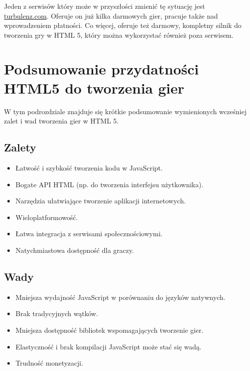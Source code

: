 Jeden z serwisów który może w przyszłości zmienić tę sytuację jest \url{turbulenz.com}.
Oferuje on już kilka darmowych gier,
pracuje także nad wprowadzeniem płatności. Co więcej, oferuje też darmowy, kompletny silnik
do tworzenia gry w HTML 5, który można wykorzystać również poza serwisem.

\section{Podsumowanie przydatności HTML5 do tworzenia gier}
\label{sec:przydatność}

W tym podrozdziale znajduje się krótkie podsumowanie wymienionych wcześniej zalet i wad
tworzenia gier w HTML 5.

\subsection{Zalety}
\label{ssec:zalety}

\begin{itemize}
\item Łatwość i szybkość tworzenia kodu w JavaScript.
\item Bogate API HTML (np. do tworzenia interfejsu użytkownika).
\item Narzędzia ułatwiające tworzenie aplikacji internetowych.
\item Wieloplatformowość.
\item Łatwa integracja z serwisami społecznościowymi.
\item Natychmiastowa dostępność dla graczy.
\end{itemize}

\subsection{Wady}
\label{ssec:wady}

\begin{itemize}
\item Mniejsza wydajność JavaScript w porównaniu do języków natywnych.
\item Brak tradycyjnych wątków.
\item Mniejsza dostępność bibliotek wspomagających tworzenie gier.
\item Elastyczność i brak kompilacji JavaScript może stać się wadą.
\item Trudność monetyzacji.
\end{itemize}




